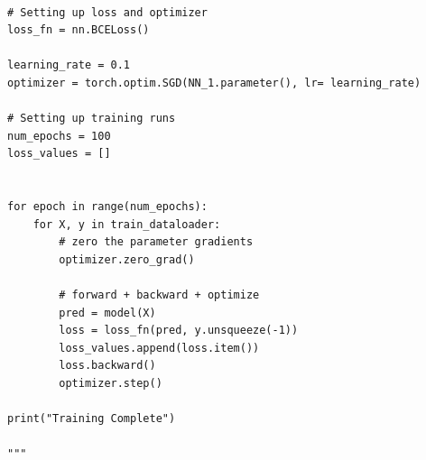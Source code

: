 \begin{lstlisting}[language=iPython, caption={}]

# Setting up loss and optimizer
loss_fn = nn.BCELoss()

learning_rate = 0.1
optimizer = torch.optim.SGD(NN_1.parameter(), lr= learning_rate)

# Setting up training runs
num_epochs = 100
loss_values = []


for epoch in range(num_epochs):
    for X, y in train_dataloader:
        # zero the parameter gradients
        optimizer.zero_grad()
       
        # forward + backward + optimize
        pred = model(X)
        loss = loss_fn(pred, y.unsqueeze(-1))
        loss_values.append(loss.item())
        loss.backward()
        optimizer.step()

print("Training Complete")

"""

	
\end{lstlisting}
